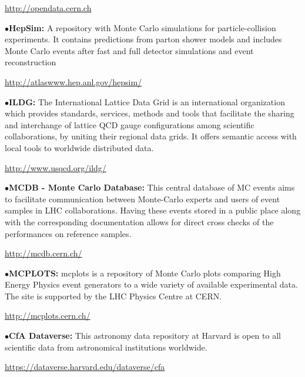 	\item{}\qquad\url{http://opendata.cern.ch}
\medskip

\item{$\bullet$}{\bf HepSim:}
A repository with Monte Carlo simulations for particle-collision experiments. It contains predictions from parton shower models and includes Monte Carlo events after fast and full detector simulations and event reconstruction
	\item{}\qquad\url{http://atlaswww.hep.anl.gov/hepsim/}

\medskip

\item{$\bullet$}{\bf ILDG:} 
The International Lattice Data Grid is an international organization which provides standards, services, methods and tools that facilitate the sharing and interchange of lattice QCD gauge configurations among scientific collaborations, by uniting their regional data grids. It offers semantic access with local tools to worldwide distributed data.
	\item{}\qquad\url{http://www.usqcd.org/ildg/}

\medskip

\item{$\bullet$}{\bf MCDB - Monte Carlo Database:}
This central database of MC events aims to facilitate communication between Monte-Carlo experts and users of event samples in LHC collaborations. Having these events stored in a public place along with the corresponding documentation allows for direct cross checks of the performances on reference samples.
	\item{}\qquad\url{http://mcdb.cern.ch/}

\medskip

\item{$\bullet$}{\bf MCPLOTS:} 
mcplots is a repository of Monte Carlo plots comparing High Energy Physics event generators to a wide variety of available experimental data. The site is supported by the LHC Physics Centre at CERN.
	\item{}\qquad\url{http://mcplots.cern.ch/}

\medskip



\item{$\bullet$}{\bf CfA Dataverse:} 
This astronomy data repository at Harvard is open to all scientific data from astronomical institutions worldwide.
	\item{}\qquad\url{https://dataverse.harvard.edu/dataverse/cfa} 


